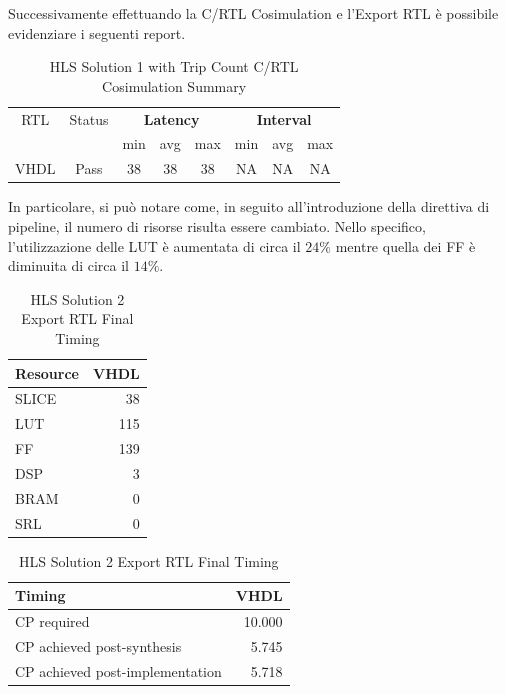 Successivamente effettuando la C/RTL Cosimulation e l'Export RTL è possibile evidenziare i seguenti report.
\begin{table}[H]
	\centering
	\begin{tabular}{|c|c|c|c|c|c|c|c|}
		\hline
		\multicolumn{1}{|c|}{RTL} & \multicolumn{1}{|c|}{Status} & \multicolumn{3}{c|}{\textbf{Latency}} & \multicolumn{3}{c|}{\textbf{Interval}} \\
		&  & min & avg & max & min & avg & max \\
		\hline
		VHDL & Pass & 38 & 38 & 38 & NA & NA & NA \\
		\hline
	\end{tabular}
	\caption{HLS Solution 1 with Trip Count C/RTL Cosimulation Summary }
	\label{tab:hls-solution-1-cosimulation-summary}
\end{table}

In particolare, si può notare come, in seguito all'introduzione della direttiva di pipeline, il numero di risorse risulta essere cambiato. Nello specifico, l'utilizzazione delle LUT è aumentata di circa il $24\%$ mentre quella dei FF è diminuita di circa il $14\%$.

\begin{table}[H]
	\centering
	\begin{minipage}[t]{0.45\linewidth}
		\centering
		\begin{tabular}{|l|r|}
			\hline
			\textbf{Resource} & \textbf{VHDL} \\
			\hline
			SLICE & 38 \\
			\hline
			LUT & 115 \\
			\hline
			FF & 139 \\
			\hline
			DSP & 3 \\
			\hline
			BRAM & 0 \\
			\hline
			SRL & 0 \\
			\hline
		\end{tabular}
		\caption{HLS Solution 2t Export RTL Resource Usage}
		\label{tab:hls-solution-2-export-rtl-resoruce-usage}
	\end{minipage}
	\hfill
	\begin{minipage}[t]{0.45\linewidth}
		\centering
		\begin{tabular}{|l|r|}
			\hline
			\textbf{Timing} & \textbf{VHDL} \\
			\hline
			CP required & 10.000 \\
			\hline
			CP achieved post-synthesis & 5.745 \\
			\hline
			CP achieved post-implementation & 5.718 \\
			\hline
		\end{tabular}
		\caption{HLS Solution 2 Export RTL Final Timing}
		\label{tab:hls-solution-2-export-rtl-final-timing}
	\end{minipage}
\end{table}